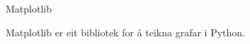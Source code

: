 \begin{frame}{Matplotlib}
  
  Matplotlib er eit bibliotek for å teikna grafar i Python.

\end{frame}
